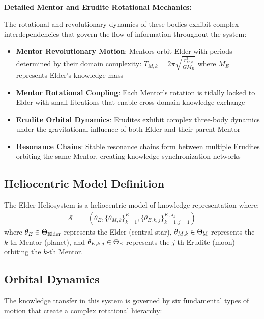 \textbf{Detailed Mentor and Erudite Rotational Mechanics:}

The rotational and revolutionary dynamics of these bodies exhibit complex interdependencies that govern the flow of information throughout the system:

\begin{itemize}
    \item \textbf{Mentor Revolutionary Motion}: Mentors orbit Elder with periods determined by their domain complexity: $T_{M,k} = 2\pi\sqrt{\frac{r_{M,k}^3}{GM_E}}$ where $M_E$ represents Elder's knowledge mass
    \item \textbf{Mentor Rotational Coupling}: Each Mentor's rotation is tidally locked to Elder with small librations that enable cross-domain knowledge exchange
    \item \textbf{Erudite Orbital Dynamics}: Erudites exhibit complex three-body dynamics under the gravitational influence of both Elder and their parent Mentor
    \item \textbf{Resonance Chains}: Stable resonance chains form between multiple Erudites orbiting the same Mentor, creating knowledge synchronization networks
\end{itemize}

\subsection{Heliocentric Model Definition}

\begin{definition}
The Elder Heliosystem is a heliocentric model of knowledge representation where:
\begin{align}
\mathcal{S} &= (\theta_E, \{\theta_{M,k}\}_{k=1}^K, \{\theta_{E,k,j}\}_{k=1,j=1}^{K,J_k})
\end{align}
where $\theta_E \in \Theta_{\text{Elder}}$ represents the Elder (central star), $\theta_{M,k} \in \Theta_{\text{M}}$ represents the $k$-th Mentor (planet), and $\theta_{E,k,j} \in \Theta_{\text{E}}$ represents the $j$-th Erudite (moon) orbiting the $k$-th Mentor.
\end{definition}

\subsection{Orbital Dynamics}

The knowledge transfer in this system is governed by six fundamental types of motion that create a complex rotational hierarchy:


